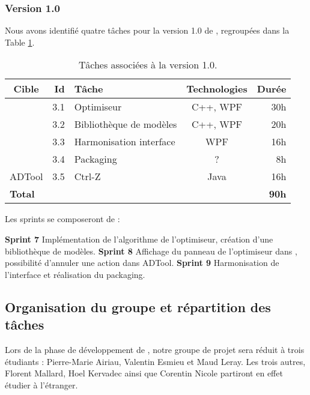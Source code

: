 	\subsubsection{Version 1.0}
		Nous avons identifié quatre tâches pour la version 1.0 de \glasir{}, regroupées dans la {\sc Table} \ref{tab:taches_units_3}.
		\begin{table}[h]
			\centering
			\begin{tabular}{|c|r|l|c|r|}
				\hline
				\textbf{Cible} & \textbf{Id} & \textbf{Tâche} & \textbf{Technologies} & \textbf{Durée}\\
				\hline

				\multirow{4}{*}{\glasir{}} & 3.1 & Optimiseur & C++, WPF & 30h\\
				\cline{2-5}
				 & 3.2 & Bibliothèque de modèles & C++, WPF & 20h\\
				\cline{2-5}
				 & 3.3 & Harmonisation interface & WPF & 16h\\
				\cline{2-5}
				 & 3.4 & Packaging & ? & 8h\\
				\hline

				\multirow{1}{*}{ADTool} & 3.5 & Ctrl-Z & \multirow{1}{*}{Java} & 16h\\
				\hline

				\multicolumn{4}{|l|}{\bf Total} & {\bf 90h}\\
				\hline
			\end{tabular}
			\caption{Tâches associées à la version 1.0.}
			\label{tab:taches_units_3}
		\end{table}
		
		Les sprints se composeront de :		
		
		\textbf{Sprint 7} Implémentation de l'algorithme de l'optimiseur, création d'une bibliothèque de modèles.\newline
		\textbf{Sprint 8} Affichage du panneau de l'optimiseur dans \glasir{}, possibilité d'annuler une action dans ADTool.\newline
		\textbf{Sprint 9} Harmonisation de l'interface et réalisation du packaging. \newline

	
	\subsection{Organisation du groupe et répartition des tâches}
		Lors de la phase de développement de \glasir{}, notre groupe de projet sera réduit à trois étudiants : Pierre-Marie {\sc Airiau}, Valentin {\sc Esmieu} et Maud {\sc Leray}. Les trois autres, Florent {\sc Mallard}, Hoel {\sc Kervadec} ainsi que Corentin {\sc Nicole} partiront en effet étudier à l'étranger.
		
